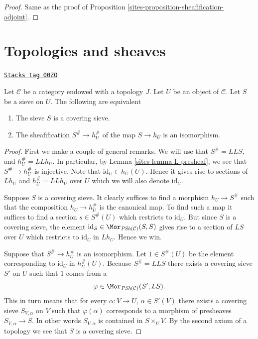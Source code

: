 \begin{proof}

Same as the proof of Proposition \ref{sites-proposition-sheafification-adjoint}.
\end{proof}

\section{Topologies and sheaves}
\label{sites-section-topology-and-sheaves}
\begin{lemma}
\label{sites-lemma-sieve-sheafification}
\href{https://stacks.math.columbia.edu/tag/00ZO}{\texttt{Stacks tag 00ZO}}

Let $\mathcal{C}$ be a category endowed with a topology $J$.
Let $U$ be an object of $\mathcal{C}$.
Let $S$ be a sieve on $U$. The following are equivalent
\begin{enumerate}
\item The sieve $S$ is a covering sieve.
\item The sheafification $S^\# \to h_U^\#$
of the map $S \to h_U$ is an isomorphism.
\end{enumerate}
\end{lemma}

\begin{proof}

First we make a couple of general remarks.
We will use that $S^\# = LLS$, and $h_U^\# = LLh_U$.
In particular, by Lemma \ref{sites-lemma-L-presheaf}, we see that
$S^\# \to h_U^\#$ is injective. Note that
$\text{id}_U \in h_U(U)$. Hence it gives rise to
sections of $Lh_U$ and $h_U^\# = LLh_U$ over $U$ which
we will also denote $\text{id}_U$.

\medskip\noindent
Suppose $S$ is a covering sieve. It clearly suffices to
find a morphism $h_U \to S^\#$ such that the composition
$h_U \to h_U^\#$ is the canonical map. To find such a map
it suffices to find a section $s \in S^\#(U)$ which restricts
to $\text{id}_U$. But since $S$ is a
covering sieve, the element
$\text{id}_S \in \Mor_{\textit{PSh}(\mathcal{C})}(S, S)$
gives rise to a section of $LS$ over $U$ which restricts to
$\text{id}_U$ in $Lh_U$. Hence we win.

\medskip\noindent
Suppose that $S^\# \to h_U^\#$ is an isomorphism.
Let $1 \in S^\#(U)$ be the element corresponding to
$\text{id}_U$ in $h_U^\#(U)$. Because $S^\# = LLS$
there exists a covering sieve $S'$ on $U$ such that
$1$ comes from a
$$
\varphi \in \Mor_{\textit{PSh}(\mathcal{C})}(S', LS).
$$
This in turn means that for every $\alpha : V \to U$,
$\alpha\in S'(V)$ there exists a covering sieve $S_{V, \alpha}$
on $V$ such that $\varphi(\alpha)$ corresponds to
a morphism of presheaves $S_{V, \alpha} \to S$. In other words
$S_{V, \alpha}$ is contained in $S \times_U V$. By the second
axiom of a topology we see that $S$ is a covering sieve.
\end{proof}

